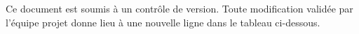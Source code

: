 
Ce document est soumis à un contrôle de version. Toute modification validée par l’équipe projet donne lieu à une nouvelle ligne dans le tableau ci-dessous.

